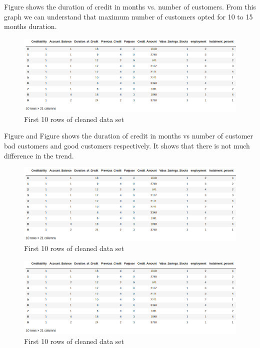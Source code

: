 \documentclass[sigconf]{acmart}
\begin{document}
Figure shows the duration of credit in months vs. number of customers. From this graph we can understand that maximum number of customers opted for 10 to 15 months duration.

\begin{figure}[htb]
  \centering
  \includegraphics[width=1.0\columnwidth]{project/images/Figure3.png}
  \caption{First 10 rows of cleaned data set
  \cite{psu-site}}
  \label{fig:Figure3} 
\end{figure}

Figure and Figure shows the duration of credit in months vs number of customer bad customers and good customers respectively. It shows that there is not much difference in the trend.

\begin{figure}[htb]
  \centering
  \includegraphics[width=1.0\columnwidth]{project/images/Figure3.png}
  \caption{First 10 rows of cleaned data set
  \cite{psu-site}}
  \label{fig:Figure3} 
\end{figure}

\begin{figure}[htb]
  \centering
  \includegraphics[width=1.0\columnwidth]{project/images/Figure3.png}
  \caption{First 10 rows of cleaned data set
  \cite{psu-site}}
  \label{fig:Figure3} 
\end{figure}
\end{document}
